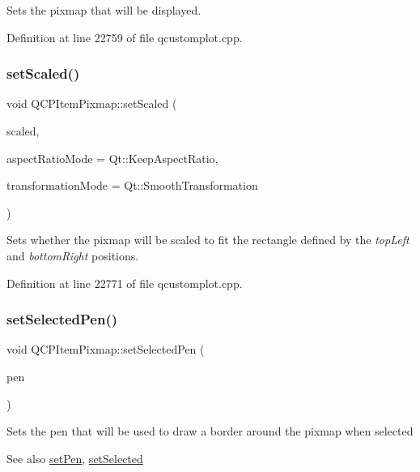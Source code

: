 Sets the pixmap that will be displayed. 

Definition at line 22759 of file qcustomplot.\+cpp.

\mbox{\label{class_q_c_p_item_pixmap_ab4d44529a1c6c8d37d0ea7560e042777}} 
\subsubsection{\texorpdfstring{set\+Scaled()}{setScaled()}}
{\footnotesize\ttfamily void Q\+C\+P\+Item\+Pixmap\+::set\+Scaled (\begin{DoxyParamCaption}\item[{bool}]{scaled,  }\item[{Qt\+::\+Aspect\+Ratio\+Mode}]{aspect\+Ratio\+Mode = {\ttfamily Qt\+:\+:KeepAspectRatio},  }\item[{Qt\+::\+Transformation\+Mode}]{transformation\+Mode = {\ttfamily Qt\+:\+:SmoothTransformation} }\end{DoxyParamCaption})}

Sets whether the pixmap will be scaled to fit the rectangle defined by the {\itshape top\+Left} and {\itshape bottom\+Right} positions. 

Definition at line 22771 of file qcustomplot.\+cpp.

\mbox{\label{class_q_c_p_item_pixmap_afc5e479e88e53740176ce77cb70dd67a}} 
\subsubsection{\texorpdfstring{set\+Selected\+Pen()}{setSelectedPen()}}
{\footnotesize\ttfamily void Q\+C\+P\+Item\+Pixmap\+::set\+Selected\+Pen (\begin{DoxyParamCaption}\item[{const Q\+Pen \&}]{pen }\end{DoxyParamCaption})}

Sets the pen that will be used to draw a border around the pixmap when selected

\begin{DoxySeeAlso}{See also}
\hyperlink{class_q_c_p_item_pixmap_acdade1305edb4b5cae14f97fd132065f}{set\+Pen}, \hyperlink{class_q_c_p_abstract_item_a203de94ad586cc44d16c9565f49d3378}{set\+Selected} 
\end{DoxySeeAlso}


